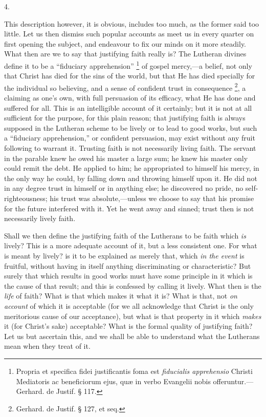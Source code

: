 4.

This description however, it is obvious, includes too much, as the
former said too little. Let us then dismiss such popular accounts as
meet us in every quarter on first opening the subject, and endeavour
to fix our minds on it more steadily. What then are we to say that
justifying faith really is? The Lutheran divines define it to be a
``fiduciary apprehension'' \footnote{Propria et
specifica fidei justificantis foma est \emph{fiducialis apprehensio}
Christi Mediatoris ac beneficiorum ejus, quæ in verbo Evangelii
nobis offeruntur.—Gerhard. de Justif. § 117.} of gospel mercy,—a
belief, not only that Christ has died for the sins of the world, but
that He has died specially for the individual so believing, and a
sense of confident trust in consequence \footnote{Gerhard. de
Justif. § 127, et seq.}, a claiming as one's
own, with full persuasion of its efficacy, what He has done and
suffered for all. This is an intelligible account of it certainly; but
it is not at all sufficient for the purpose, for this plain reason;
that justifying faith is always supposed in the Lutheran scheme to be
lively or to lead to good works, but such a ``fiduciary
apprehension,'' or confident persuasion, may exist without any
fruit following to warrant it. Trusting faith is not necessarily
living faith. The servant in the parable knew he owed his master a
large sum; he knew his master only could remit the debt. He applied to
him; he appropriated to himself his mercy, in the only way he could,
by falling down and throwing himself upon it. He did not in any degree
trust in himself or in anything else; he discovered no pride, no
self-righteousness; his trust was absolute,—unless we choose to say
that his promise for the future interfered with it. Yet he went away
and sinned; trust then is not necessarily lively faith.

Shall we then define the justifying faith of the Lutherans to be
faith which \emph{is} lively? This is a more adequate account of it,
but a less consistent one. For what is meant by lively? is it to be
explained as merely that, which \emph{in the event} is fruitful,
without having in itself anything discriminating or characteristic?
But surely that which results in good works must have some principle
in it which is the cause of that result; and this is confessed by
calling it lively. What then is the \emph{life} of faith? What is that
which makes it what it is? What is that, not \emph{on account} of
which it is acceptable (for we all acknowledge that Christ is the only
meritorious cause of our acceptance), but what is that property in it
which \emph{makes} it (for Christ's sake) acceptable? What is the
formal quality of justifying faith? Let us but ascertain this, and we
shall be able to understand what the Lutherans mean when they treat of
it.

